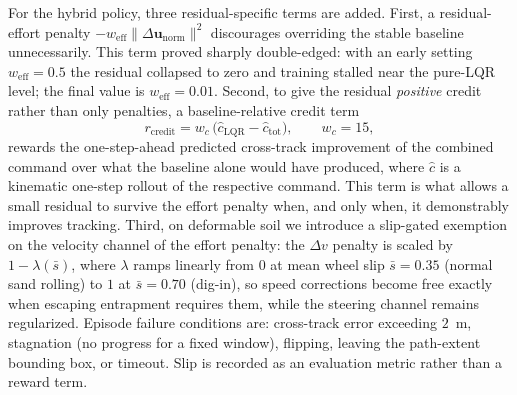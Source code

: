 \documentclass[conference]{IEEEtran}
\begin{document}
For the hybrid policy, three residual-specific terms are added. First, a residual-effort penalty $-w_{\text{eff}}\lVert\Delta\mathbf{u}_{\text{norm}}\rVert^2$ discourages overriding the stable baseline unnecessarily. This term proved sharply double-edged: with an early setting $w_{\text{eff}}=0.5$ the residual collapsed to zero and training stalled near the pure-LQR level; the final value is $w_{\text{eff}}=0.01$. Second, to give the residual \emph{positive} credit rather than only penalties, a baseline-relative credit term
\begin{equation}
r_{\text{credit}} = w_{c}\,\big(\hat{c}_{\text{LQR}} - \hat{c}_{\text{tot}}\big), \qquad w_c = 15,
\end{equation}
rewards the one-step-ahead predicted cross-track improvement of the combined command over what the baseline alone would have produced, where $\hat{c}$ is a kinematic one-step rollout of the respective command. This term is what allows a small residual to survive the effort penalty when, and only when, it demonstrably improves tracking. Third, on deformable soil we introduce a slip-gated exemption on the velocity channel of the effort penalty: the $\Delta v$ penalty is scaled by $1-\lambda(\bar{s})$, where $\lambda$ ramps linearly from $0$ at mean wheel slip $\bar{s}=0.35$ (normal sand rolling) to $1$ at $\bar{s}=0.70$ (dig-in), so speed corrections become free exactly when escaping entrapment requires them, while the steering channel remains regularized. Episode failure conditions are: cross-track error exceeding $2$~m, stagnation (no progress for a fixed window), flipping, leaving the path-extent bounding box, or timeout. Slip is recorded as an evaluation metric rather than a reward term.
\end{document}

